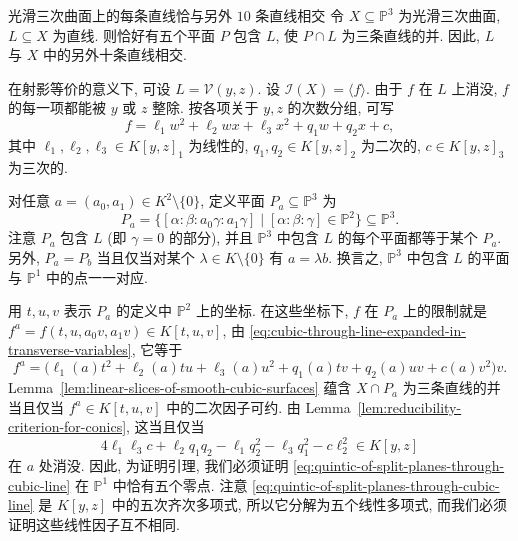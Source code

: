 \begin{Lemma}{光滑三次曲面上的每条直线恰与另外 $10$ 条直线相交}\leavevmode\label{lem:line-on-smooth-cubic-meets-ten-others}
令 $X\subseteq\mathbb{P}^{3}$ 为光滑三次曲面, $L\subseteq X$ 为直线. 则恰好有五个平面 $P$ 包含 $L$, 使 $P\cap L$ 为三条直线的并. 因此, $L$ 与 $X$ 中的另外十条直线相交.
\end{Lemma}
\begin{Proof}
在射影等价的意义下, 可设 $L=\mathcal{V}(y,z)$. 设 $\mathcal{I}(X)=\langle f\rangle$. 由于 $f$ 在 $L$ 上消没, $f$ 的每一项都能被 $y$ 或 $z$ 整除. 按各项关于 $y,z$ 的次数分组, 可写
\begin{equation}\label{eq:cubic-through-line-expanded-in-transverse-variables}
  f=\ell_{1}w^{2}+\ell_{2}wx+\ell_{3}x^{2}+q_{1}w+q_{2}x+c,
\end{equation}
其中 $\ell_{1},\ell_{2},\ell_{3}\in K[y,z]_{1}$ 为线性的, $q_{1},q_{2}\in K[y,z]_{2}$ 为二次的, $c\in K[y,z]_{3}$ 为三次的.

对任意 $a=(a_{0},a_{1})\in K^{2}\setminus\{0\}$, 定义平面 $P_{a}\subseteq\mathbb{P}^{3}$ 为
\[
  P_{a}=\{[\alpha:\beta:a_{0}\gamma:a_{1}\gamma]\mid
  [\alpha:\beta:\gamma]\in\mathbb{P}^{2}\}\subseteq\mathbb{P}^{3}.
\]
注意 $P_{a}$ 包含 $L$ (即 $\gamma=0$ 的部分), 并且 $\mathbb{P}^{3}$ 中包含 $L$ 的每个平面都等于某个 $P_{a}$. 另外, $P_{a}=P_{b}$ 当且仅当对某个 $\lambda\in K\setminus\{0\}$ 有 $a=\lambda b$. 换言之, $\mathbb{P}^{3}$ 中包含 $L$ 的平面与 $\mathbb{P}^{1}$ 中的点一一对应.

用 $t,u,v$ 表示 $P_{a}$ 的定义中 $\mathbb{P}^{2}$ 上的坐标. 在这些坐标下, $f$ 在 $P_{a}$ 上的限制就是 $f^{a}=f(t,u,a_{0}v,a_{1}v)\in K[t,u,v]$, 由 \eqref{eq:cubic-through-line-expanded-in-transverse-variables}, 它等于
\[
  f^{a}=\bigl(\ell_{1}(a)t^{2}+\ell_{2}(a)tu+\ell_{3}(a)u^{2}
  +q_{1}(a)tv+q_{2}(a)uv+c(a)v^{2}\bigr)v.
\]
Lemma~\ref{lem:linear-slices-of-smooth-cubic-surfaces} 蕴含 $X\cap P_{a}$ 为三条直线的并当且仅当 $f^{a}\in K[t,u,v]$ 中的二次因子可约. 由 Lemma~\ref{lem:reducibility-criterion-for-conics}, 这当且仅当
\begin{equation}\label{eq:quintic-of-split-planes-through-cubic-line}
  4\ell_{1}\ell_{3}c+\ell_{2}q_{1}q_{2}-\ell_{1}q_{2}^{2}
  -\ell_{3}q_{1}^{2}-c\ell_{2}^{2}\in K[y,z]
\end{equation}
在 $a$ 处消没. 因此, 为证明引理, 我们必须证明 \eqref{eq:quintic-of-split-planes-through-cubic-line} 在 $\mathbb{P}^{1}$ 中恰有五个零点. 注意 \eqref{eq:quintic-of-split-planes-through-cubic-line} 是 $K[y,z]$ 中的五次齐次多项式, 所以它分解为五个线性多项式, 而我们必须证明这些线性因子互不相同.


\end{Proof}
